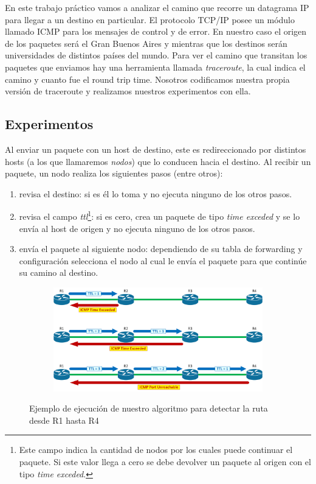 En este trabajo práctico vamos a analizar el camino que recorre un datagrama IP para llegar a un destino en particular. El protocolo TCP/IP posee un módulo llamado ICMP para los mensajes de control y de error.
En nuestro caso el origen de los paquetes será el Gran Buenos Aires y mientras que los destinos serán universidades de distintos países del mundo. Para ver el camino que transitan los paquetes que enviamos hay una herramienta llamada \emph{traceroute}, la cual indica el camino y cuanto fue el round trip time.
Nosotros codificamos nuestra propia versión de traceroute y realizamos nuestros experimentos con ella.

\subsection{Experimentos}
\par Al enviar un paquete con un host de destino, este es redireccionado por distintos hosts (a los que llamaremos \textit{nodos}) que lo conducen hacia el destino. Al recibir un paquete, un nodo realiza los siguientes pasos (entre otros):
\begin{enumerate}
  \item revisa el destino: si es él lo toma y no ejecuta ninguno de los otros pasos.
  \item revisa el campo \textit{ttl}\footnote{Este campo indica la cantidad de nodos por los cuales puede continuar el paquete. Si este valor llega a cero se debe devolver un paquete al origen con el tipo \textit{time exceded}.}: si es cero, crea un paquete de tipo \textit{time exceded} y se lo envía al host de origen y no ejecuta ninguno de los otros pasos.
  \item envía el paquete al siguiente nodo: dependiendo de su tabla de forwarding y configuración selecciona el nodo al cual le envía el paquete para que continúe su camino al destino.
\end{enumerate}
\begin{figure}[ht]
  \begin{subfigure}[b]{.5\textwidth}
    \includegraphics[width=\textwidth]{Imagenes/explicacion_traceroute.png}
  \end{subfigure}
  \label{fig:explicacion_traceroute}
  \caption{Ejemplo de ejecución de nuestro algoritmo para detectar la ruta desde R1 hasta R4}
\end{figure}
